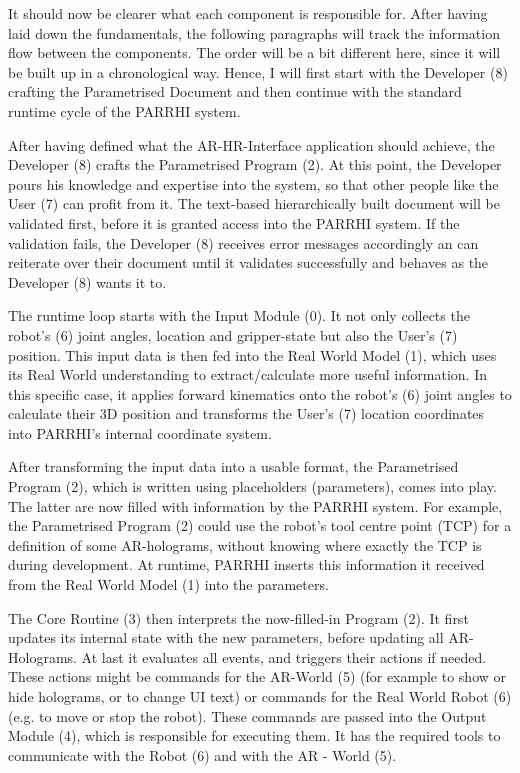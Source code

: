 It should now be clearer what each component is responsible for. After having laid down the fundamentals, the following paragraphs will track the information flow between the components. The order will be a bit different here, since it will be built up in a chronological way. Hence, I will first start with the Developer (8) crafting the Parametrised Document and then continue with the standard runtime cycle of the PARRHI system.

After having defined what the AR-HR-Interface application should achieve, the Developer (8) crafts the Parametrised Program (2). At this point, the Developer pours his knowledge and expertise into the system, so that other people like the User (7) can profit from it. The text-based hierarchically built document will be validated first, before it is granted access into the PARRHI system. If the validation fails, the Developer (8) receives error messages accordingly an can reiterate over their document until it validates successfully and behaves as the Developer (8) wants it to.

The runtime loop starts with the Input Module (0). It not only collects the robot's (6) joint angles, location and gripper-state but also the User's (7) position. This input data is then fed into the Real World Model (1), which uses its Real World understanding to extract/calculate more useful information. In this specific case, it applies forward kinematics onto the robot's (6) joint angles to calculate their 3D position and transforms the User's (7) location coordinates into PARRHI's internal coordinate system. 

After transforming the input data into a usable format, the Parametrised Program (2), which is written using placeholders (parameters), comes into play. The latter are now filled with information by the PARRHI system. For example, the Parametrised Program (2) could use the robot's tool centre point (TCP) for a definition of some AR-holograms, without knowing where exactly the TCP is during development. At runtime, PARRHI inserts this information it received from the Real World Model (1) into the parameters. 

The Core Routine (3) then interprets the now-filled-in Program (2). It first updates its internal state with the new parameters, before updating all AR-Holograms. At last it evaluates all events, and triggers their actions if needed. These actions might be commands for the AR-World (5) (for example to show or hide holograms, or to change UI text) or commands for the Real World Robot (6) (e.g. to move or stop the robot). These commands are passed into the Output Module (4), which is responsible for executing them. It has the required tools to communicate with the Robot (6) and with the AR - World (5). 

